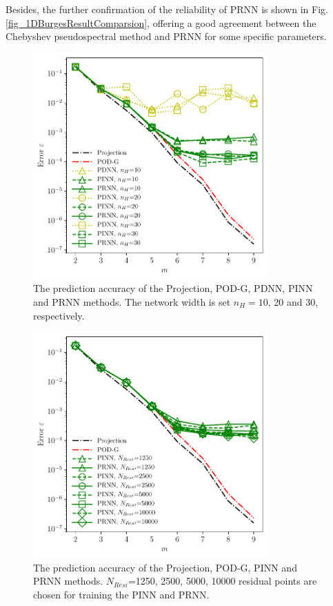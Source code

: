 \documentclass[preprint, 10pt]{elsarticle}
\begin{document}
Besides, the further confirmation of the reliability of PRNN is shown in Fig. \ref{fig_1DBurgesResultComparsion}, offering a good agreement between the Chebyshev pseudospectral method and PRNN for some specific parameters.

\begin{figure}[!ht]
  \centering
  \includegraphics[width=9cm]{../../pythonNN/1DBurges/fig/ErrorComparsion_Netsize.pdf}
\caption{The prediction accuracy of the Projection, POD-G, PDNN, PINN and PRNN methods. The network width is set $n_H=10$, 20 and 30, respectively.}
\label{fig_1DBurgesErrorComparsion_Netsize}
\end{figure}

\begin{figure}[!ht]
  \centering
  \includegraphics[width=9cm]{../../pythonNN/1DBurges/fig/ErrorComparsion_NResi.pdf}
\caption{The prediction accuracy of the Projection, POD-G, PINN and PRNN methods. $N_{Resi}$=1250, 2500, 5000, 10000 residual points are chosen for training the PINN and PRNN.}
\label{fig_1DBurgesErrorComparsion_NResi}
\end{figure}
\end{document}
